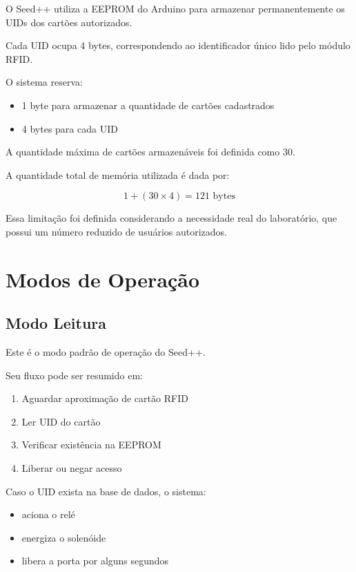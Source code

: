 \documentclass[a4paper,12pt]{article}
\begin{document}
O Seed++ utiliza a EEPROM do Arduino para armazenar permanentemente os UIDs dos cartões autorizados.

Cada UID ocupa 4 bytes, correspondendo ao identificador único lido pelo módulo RFID.

O sistema reserva:

\begin{itemize}
    \item 1 byte para armazenar a quantidade de cartões cadastrados
    \item 4 bytes para cada UID
\end{itemize}

A quantidade máxima de cartões armazenáveis foi definida como 30.

A quantidade total de memória utilizada é dada por:

\[
1 + (30 \times 4) = 121 \text{ bytes}
\]

Essa limitação foi definida considerando a necessidade real do laboratório, que possui um número reduzido de usuários autorizados.

\section{Modos de Operação}

\subsection{Modo Leitura}

Este é o modo padrão de operação do Seed++.

Seu fluxo pode ser resumido em:

\begin{enumerate}
    \item Aguardar aproximação de cartão RFID
    \item Ler UID do cartão
    \item Verificar existência na EEPROM
    \item Liberar ou negar acesso
\end{enumerate}

Caso o UID exista na base de dados, o sistema:

\begin{itemize}
    \item aciona o relé
    \item energiza o solenóide
    \item libera a porta por alguns segundos
\end{itemize}
\end{document}
